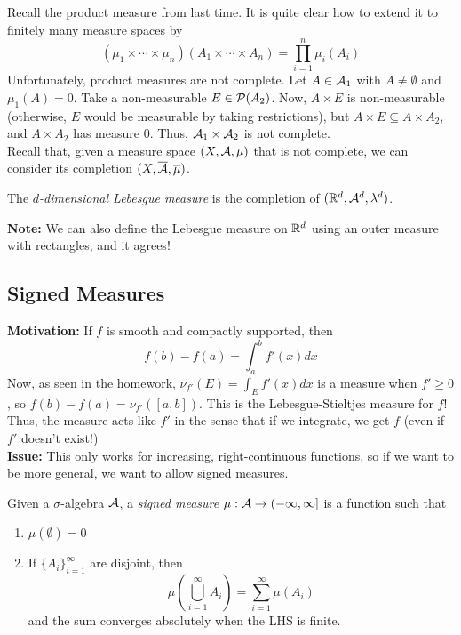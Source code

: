 
Recall the product measure from last time. It is quite clear how to extend it to finitely many measure spaces by
\[ (\mu_1 \times \cdots \times \mu_n)(A_1 \times \cdots \times A_n) = \prod_{i = 1}^{n} \mu_i(A_i) \]
Unfortunately, product measures are not complete. Let $A \in \cal{A}_1$ with $A \neq \emptyset$ and $\mu_1(A) = 0$. Take a non-measurable $E \in \P(A_2)$. 
Now, $A \times E$ is non-measurable (otherwise, $E$ would be measurable by taking restrictions), but $A \times E \subseteq A \times A_2$, and $A \times A_2$ has measure $0$. Thus, $\cal{A}_1 \times \cal{A}_2$ is not complete.\\ 

Recall that, given a measure space $(X, \cal{A}, \mu)$ that is not complete, we can consider its completion $(X, \overline{\cal{A}}, \overline{\mu})$.

\begin{definition}
    The \emph{$d$-dimensional Lebesgue measure} is the completion of $(\R^d, \cal{A}^d, \lambda^d)$.
\end{definition}

\textbf{Note:} We can also define the Lebesgue measure on $\R^d$ using an outer measure with rectangles, and it agrees!

\subsection*{Signed Measures}
\sectionspace

\textbf{Motivation:} If $f$ is smooth and compactly supported, then
\[ f(b) - f(a) = \int_{a}^{b} f'(x) dx \]
Now, as seen in the homework, $\nu_{f'}(E) = \int_{E} f'(x) dx$ is a measure when $f' \geq 0$, so $f(b) - f(a) = \nu_{f'}([a, b])$. This is the Lebesgue-Stieltjes measure for $f$! Thus, the measure acts like $f'$ in the sense that if we integrate, we get $f$ (even if $f'$ doesn't exist!)\\

\textbf{Issue:} This only works for increasing, right-continuous functions, so if we want to be more general, we want to allow signed measures.

\begin{definition}
    Given a $\sigma$-algebra $\cal{A}$, a \emph{signed measure} $\mu : \cal{A} \to (-\infty, \infty]$ is a function such that
    \begin{enumerate}
        \item $\mu(\emptyset) = 0$
        \item If $\{A_i\}_{i = 1}^{\infty}$ are disjoint, then
        \[ \mu\left(\bigcup_{i = 1}^{\infty} A_i\right) = \sum_{i = 1}^{\infty} \mu(A_i) \]
        and the sum converges absolutely when the LHS is finite.
    \end{enumerate}
\end{definition}

